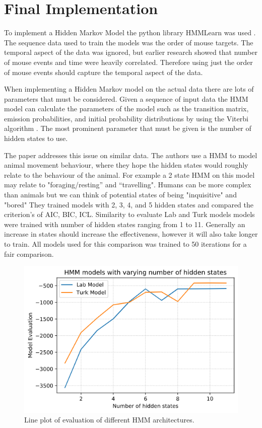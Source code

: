 \documentclass{article}
\begin{document}
\section{Final Implementation}

To implement a Hidden Markov Model the python library HMMLearn was used \cite{hmmlearn}.
The sequence data used to train the models was the order of mouse targets.
The temporal aspect of the data was ignored, but earlier research showed that number of mouse events and time were heavily correlated.
Therefore using just the order of mouse events should capture the temporal aspect of the data.

When implementing a Hidden Markov model on the actual data there are lots of parameters that must be considered. 
Given a sequence of input data the HMM model can calculate the parameters of the model such as the transition matrix, emission probabilities, and initial probability distributions by using the Viterbi algorithm \cite{hmmlearn}.
The most prominent parameter that must be given is the number of hidden states to use.

The paper \cite{pohle2017selecting} addresses this issue on similar data.
The authors use a HMM to model animal movement behaviour, where they hope the hidden states would roughly relate to the behaviour of the animal.
For example a 2 state HMM on this model may relate to "foraging/resting” and “travelling".
Humans can be more complex than animals but we can think of potential states of being "inquisitive" and "bored"
They trained models with 2, 3, 4, and 5 hidden states and compared the criterion's of AIC, BIC, ICL.
Similarity to evaluate Lab and Turk models models were trained with number of hidden states ranging from 1 to 11.
Generally an increase in states should increase the effectiveness, however it will also take longer to train.
All models used for this comparison was trained to 50 iterations for a fair comparison. 

\begin{figure}[ht]
    \centering
    \includegraphics[scale=0.55]{Images/ModelEvaluation.png}
    \caption{Line plot of evaluation of different HMM architectures.}
    \label{fig:ModleEval}
\end{figure}
\end{document}
